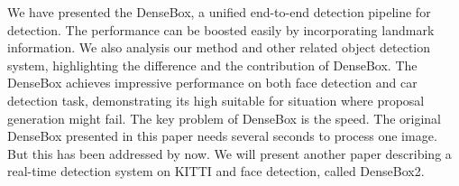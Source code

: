 We have presented the DenseBox, a unified end-to-end detection pipeline for detection. The performance can be boosted easily by incorporating landmark information. We also analysis our method and other related object detection system, highlighting the difference and the contribution of DenseBox.  The DenseBox achieves impressive performance on both face detection and car detection task, demonstrating its high suitable for situation where proposal generation might fail. The key problem of DenseBox is the speed.  The original DenseBox presented in this paper needs several seconds to process one image. But this has been addressed by now.  We will present another paper describing a real-time detection system on KITTI and face detection, called DenseBox2.  


